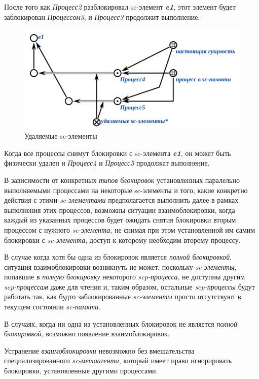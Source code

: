 После того как \textit{Процесс2} разблокировал sc-элемент \textit{\textbf{e1}}, этот элемент будет заблокирован \textit{Процессом3}, и \textit{Процесс3} продолжит выполнение.

\begin{figure}[h]
	\centering
	\includegraphics[scale=0.8]{images/part3/chapter_situation_management/plan_lock_4.png}
	\caption{Удаляемые sc-элементы}
	\label{fig:plan_lock_4}
\end{figure}

Когда все процессы снимут блокировки с sc-элемента \textit{\textbf{e1}}, он может быть физически удален и \textit{Процесс4} и \textit{Процесс5} продолжат выполнение.

В зависимости от конкретных \textit{типов блокировок} установленных паралельно выполняемыми процессами на некоторые sc-элементы и того, какие конкретно действия с этими \textit{sc-элементами} предполагается выполнить далее в рамках выполнения этих процессов, возможны ситуации взаимоблокировки, когда каждый из указанных процессов будет ожидать снятия блокировки вторым процессом с нужного \textit{sc-элемента}, не снимая при этом установленной им самим блокировки с \textit{sc-элемента}, доступ к которому необходим второму процессу.
	
В случае когда хотя бы одна из блокировок является \textit{полной блокировкой}, ситуация взаимоблокировки возникнуть не может, поскольку \textit{sc-элементы}, попавшие в \textit{полную блокировку} некоторого \textit{scp-процесса}, не доступны другим \textit{scp-процессам} даже для чтения и, таким образом, остальные \textit{scp-процессы} будут работать так, как будто заблокированные \textit{sc-элементы} просто отсутствуют в текущем состоянии \textit{sc-памяти}.

В случаях, когда ни одна из установленных блокировок не является \textit{полной блокировкой}, возможно появление взаимоблокировок.

Устранение \textit{взаимоблокировки} невозможно без вмешательства специализированного \textit{sc-метаагента}, который имеет право игнорировать блокировки, установленные другими процессами. 
	
